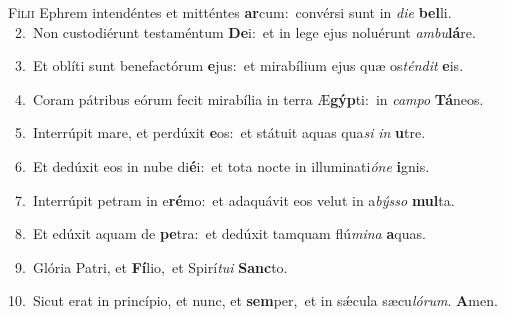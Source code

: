 \lettrine{\initial\textcolor{\initialcolor}{F}}{ílii} Ephrem intendéntes et mitténtes \textbf{ar}\-cum:~\star convérsi sunt in \textit{di}\-\textit{e} \textbf{bel}\-li.\\
{\numbfont\textcolor{\numbcolor}{~2.}}~Non custodiérunt testaméntum \textbf{De}\-i:~\star et in lege ejus noluérunt \textit{am}\-\textit{bu}\textbf{lá}re.\par
{\numbfont\textcolor{\numbcolor}{~3.}}~Et oblíti sunt benefactórum \textbf{e}\-jus:~\star et mirabílium ejus quæ os\-\textit{tén}\-\textit{dit} \textbf{e}\-is.\par
{\numbfont\textcolor{\numbcolor}{~4.}}~Coram pátribus eórum fecit mirabília in terra Æ\-\textbf{gýp}\-ti:~\star in \textit{cam}\-\textit{po} \textbf{Tá}\-neos.\par
{\numbfont\textcolor{\numbcolor}{~5.}}~Interrúpit mare, et perdúxit \textbf{e}\-os:~\star et státuit aquas qua\textit{si} \textit{in} \textbf{u}\-tre.\par
{\numbfont\textcolor{\numbcolor}{~6.}}~Et dedúxit eos in nube di\-\textbf{é}\-i:~\star et tota nocte in illuminati\-\textit{ó}\-\textit{ne} \textbf{i}\-gnis.\par
{\numbfont\textcolor{\numbcolor}{~7.}}~Interrúpit petram in e\-\textbf{ré}\-mo:~\star et adaquávit eos velut in a\-\textit{býs}\-\textit{so} \textbf{mul}\-ta.\par
{\numbfont\textcolor{\numbcolor}{~8.}}~Et edúxit aquam de \textbf{pe}\-tra:~\star et dedúxit tamquam flú\-\textit{mi}\-\textit{na} \textbf{a}\-quas.\par
{\numbfont\textcolor{\numbcolor}{~9.}}~Glória Patri, et \textbf{Fí}\-lio,~\star et Spirí\-\textit{tu}\-\textit{i} \textbf{Sanc}\-to.\par
{\numbfont\textcolor{\numbcolor}{10.}}~Sicut erat in princípio, et nunc, et \textbf{sem}\-per,~\star et in sǽcula sæcu\-\textit{ló}\-\textit{rum}. \textbf{A}\-men.\par
